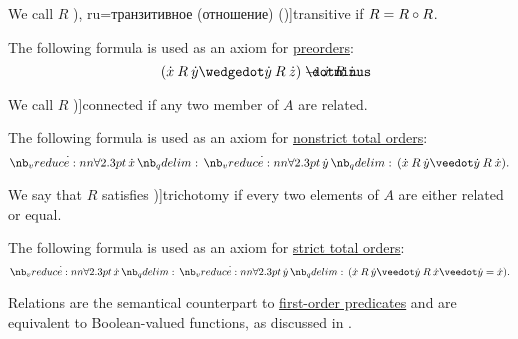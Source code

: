 \begin{definition}
\begin{thmenum}[resume=def:binary_relation]
     We call \( R \) \term[bg=транзитивна (релация) (\cite[369]{ГеновМиховскиМоллов1991Алгебра}), ru=транзитивное (отношение) (\cite[def. 2.7]{Гуров2013Решётки})]{transitive} if \( R = R \bincirc R \).

    The following formula is used as an axiom for \hyperref[def:partially_ordered_set]{preorders}:
    \begin{equation}\label{eq:def:binary_relation/transitive}
      (\synx \mathbin{R} \syny \synwedge \syny \mathbin{R} \synz) \synimplies \synx \mathbin{R} \synz.
    \end{equation}

     We call \( R \) \term[ru=полное (отношение) (\cite[def. 2.7]{Гуров2013Решётки})]{connected} if any two member of \( A \) are related.

    The following formula is used as an axiom for \hyperref[def:totally_ordered_set]{nonstrict total orders}:
    \begin{equation}\label{eq:def:binary_relation/connected}
      \qforall \synx \qforall \syny (\synx \mathbin{R} \syny \synvee \syny \mathbin{R} \synx).
    \end{equation}

     We say that \( R \) satisfies \term[bg=трихотомия (\cite[11]{Тагамлицки1971Диф})]{trichotomy} if every two elements of \( A \) are either related or equal.

    The following formula is used as an axiom for \hyperref[def:totally_ordered_set]{strict total orders}:
    \begin{equation}\label{eq:def:binary_relation/trichotomy}
      \qforall \synx \qforall \syny (\synx \mathbin{R} \syny \synvee \syny \mathbin{R} \synx \synvee \syny = \synx).
    \end{equation}
  \end{thmenum}
\end{definition}
\begin{comments}
  \item Relations are the semantical counterpart to \hyperref[def:first_order_structure/interpretation/predicate]{first-order predicates} and are equivalent to Boolean-valued functions, as discussed in .
\end{comments}

